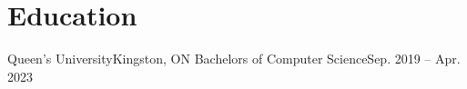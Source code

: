 \section{Education}
    \resumeSubHeadingListStart
    
    \resumeSubheading
    {Queen's University}{Kingston, ON}
    {Bachelors of Computer Science}{Sep. 2019 -- Apr. 2023}
    
    \resumeSubHeadingListEnd
